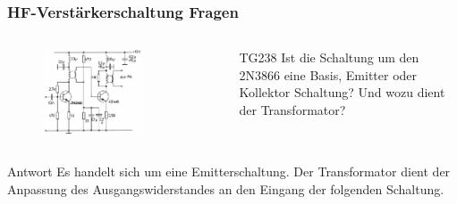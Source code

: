 \begin{frame}
  \frametitle{HF-Verstärkerschaltung Fragen}
  \begin{columns}
    \begin{figure}
      \includegraphics[width=0.7\textwidth,height=.5\textheight,keepaspectratio]{a07/TG237.png}
    \end{figure}
    \begin{center}
      \begin{exampleblock}{TG238}
        Ist die Schaltung um den 2N3866 eine Basis, Emitter oder Kollektor Schaltung? Und wozu dient der Transformator?
      \end{exampleblock}
    \end{center}
  \end{columns}
  \pause
  \begin{exampleblock}{Antwort}
    Es handelt sich um eine Emitterschaltung. Der Transformator dient der Anpassung des Ausgangswiderstandes an den Eingang der folgenden Schaltung.
  \end{exampleblock}
\end{frame}

